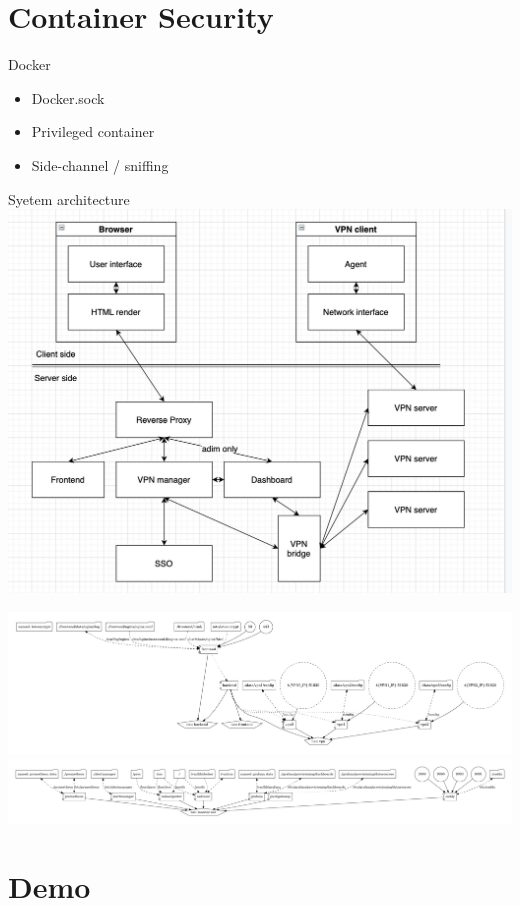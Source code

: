 \documentclass{beamer}
\begin{document}
\begin{CJK*}{UTF8}{bsmi}
  \section{Container Security}
  \begin{frame}{Docker}
    \begin{itemize}
      \item Docker.sock
      \item Privileged container
      \item Side-channel / sniffing
    \end{itemize}
  \end{frame}

  \begin{frame}{Syetem architecture}
    \centering
    \includegraphics[width=.8\textwidth]{1481224.jpg}
  \end{frame}

  \begin{frame}
    \includegraphics[width=\textwidth]{docker-compose.png}
    \includegraphics[width=\textwidth]{dashboard.png}
  \end{frame}

  \section{Demo}

\end{CJK*}
\end{document}

